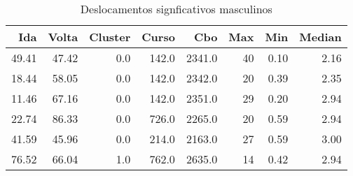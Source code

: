\begin{table}
\centering
\caption{Deslocamentos signficativos masculinos}
\label{tab:Salarios_Desequlibrio_M}
\begin{tabular}{rrrrrrrr}
\toprule
  Ida &  Volta &  Cluster &  Curso &    Cbo &  Max &  Min &  Median \\
\midrule
49.41 &  47.42 &      0.0 &  142.0 & 2341.0 &   40 & 0.10 &    2.16 \\
18.44 &  58.05 &      0.0 &  142.0 & 2342.0 &   20 & 0.39 &    2.35 \\
11.46 &  67.16 &      0.0 &  142.0 & 2351.0 &   29 & 0.20 &    2.94 \\
22.74 &  86.33 &      0.0 &  726.0 & 2265.0 &   20 & 0.59 &    2.94 \\
41.59 &  45.96 &      0.0 &  214.0 & 2163.0 &   27 & 0.59 &    3.00 \\
76.52 &  66.04 &      1.0 &  762.0 & 2635.0 &   14 & 0.42 &    2.94 \\
\bottomrule
\end{tabular}
\end{table}
